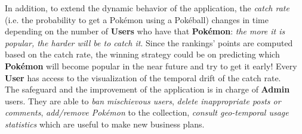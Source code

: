 In addition, to extend the dynamic behavior of the application, the \textit{catch rate} (i.e. the probability to get a Pokémon using a Pokéball) changes in time depending on the number of \textbf{Users } who have that \textbf{Pokémon}: \textit{the more it is popular, the harder will be to catch it}. Since the rankings’ points are computed based on the catch rate, the winning strategy could be on predicting which \textbf{Pokémon} will become popular in the near future and try to get it early! Every \textbf{User} has access to the visualization of the temporal drift of the catch rate. \medskip \\
The safeguard and the improvement of the application is in charge of \textbf{Admin} users. They are able to \textit{ban mischievous users}, \textit{delete inappropriate posts or comments}, \textit{add/remove Pokémon} to the collection, \textit{consult geo-temporal usage statistics} which are useful to make new business plans. \medskip \\
